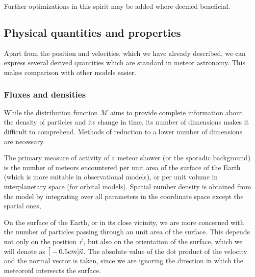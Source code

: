             Further optimizations in this spirit may be added where deemed beneficial.

    \subsection{Physical quantities and properties} \label{mop}
        Apart from the position and velocities, which we have already described, we can express
        several derived quantities which are standard in meteor astronomy. This makes comparison
        with other models easier.

        \subsubsection{Fluxes and densities} \label{mopf}
            While the distribution function $\mathcal{M}$ aims to provide complete information
            about the density of particles and its change in time,
            its number of dimensions makes it difficult to comprehend.
            Methods of reduction to a lower number of dimensions are necessary.

            The primary measure of activity of a meteor shower (or the sporadic background) is the number
            of meteors encountered per unit area of the surface of the Earth (which is more suitable
            in observational models), or per unit volume in interplanetary space (for orbital models).
            Spatial number density is obtained from the model by integrating over all parameters
            in the coordinate space except the spatial ones,

            On the surface of the Earth, or in its close vicinity, we are more concerned with
            the number of particles passing through an unit area of the surface. This depends not only
            on the position $\vec{r}$, but also on the orientation of the surface, which we will denote as~$\Hat[-0.5em]{\vec{n}}$.
            The absolute value of the dot product of the velocity and the normal vector is taken,
            since we are ignoring the direction in which the meteoroid intersects the surface.

